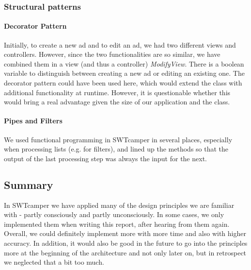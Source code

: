 \subsubsection{Structural patterns}

\paragraph{Decorator Pattern}
Initially, to create a new ad and to edit an ad, we had two different views and controllers. However, since the two functionalities are so similar, we have combined them in a view (and thus a controller) \textit{ModifyView}. There is a boolean variable to distinguish between creating a new ad or editing an existing one. The decorator pattern could have been used here, which would extend the class with additional functionality at runtime. However, it is questionable whether this would bring a real advantage given the size of our application and the class.

\paragraph{Pipes and Filters}
We used functional programming in SWTcamper in several places, especially when processing lists (e.g. for filters), and lined up the methods so that the output of the last processing step was always the input for the next.

\subsection{Summary}
In SWTcamper we have applied many of the design principles we are familiar with - partly consciously and partly unconsciously. In some cases, we only implemented them when writing this report, after hearing from them again. Overall, we could definitely implement more with more time and also with higher accuracy. In addition, it would also be good in the future to go into the principles more at the beginning of the architecture and not only later on, but in retrospect we neglected that a bit too much.